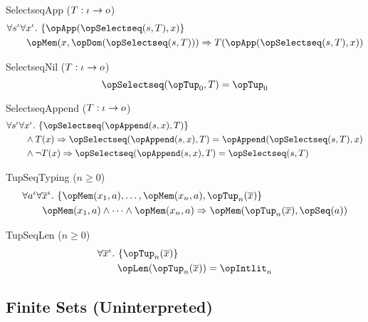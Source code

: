 \documentclass[11pt, a4paper, oneside]{article}
\begin{document}
\begin{axioms}
\item[SelectseqApp ($T : \iota \rightarrow o$)] \[
        \begin{aligned}
            &\forall s^\idv \forall x^\idv.\, \st{ \opApp(\opSelectseq(s, T), x) } \\
            &\qquad \opMem(x, \opDom(\opSelectseq(s, T))) \imp T(\opApp(\opSelectseq(s, T), x))
        \end{aligned}
    \]

\item[SelectseqNil ($T : \iota \rightarrow o$)] \[
        \opSelectseq(\opTup_0, T) = \opTup_0
    \]

\item[SelectseqAppend ($T : \iota \rightarrow o$)] \[
        \begin{aligned}
            &\forall s^\idv \forall x^\idv.\, \st{ \opSelectseq(\opAppend(s, x), T) } \\
            &\qquad \wedge T(x) \imp \opSelectseq(\opAppend(s, x), T) = \opAppend(\opSelectseq(s, T), x) \\
            &\qquad \wedge \neg T(x) \imp \opSelectseq(\opAppend(s, x), T) = \opSelectseq(s, T)
        \end{aligned}
    \]

\item[TupSeqTyping ($n \ge 0$)] \[
        \begin{aligned}
            &\forall a^\idv \forall \overline{x}^\idv.\, \st{ \opMem(x_1, a), \dots, \opMem(x_n, a), \opTup_n(\overline{x}) } \\
            &\qquad \opMem(x_1, a) \wedge \dots \wedge \opMem(x_n, a) \imp \opMem(\opTup_n(\overline{x}), \opSeq(a))
        \end{aligned}
    \]

\item[TupSeqLen ($n \ge 0$)] \[
        \begin{aligned}
            &\forall \overline{x}^\idv.\, \st{ \opTup_n(\overline{x}) } \\
            &\qquad \opLen(\opTup_n(\overline{x})) = \opIntlit_n
        \end{aligned}
    \]

\end{axioms}


    \subsection{Finite Sets (Uninterpreted)}
    \label{subsec:fsets_uninterpreted}
\end{document}
